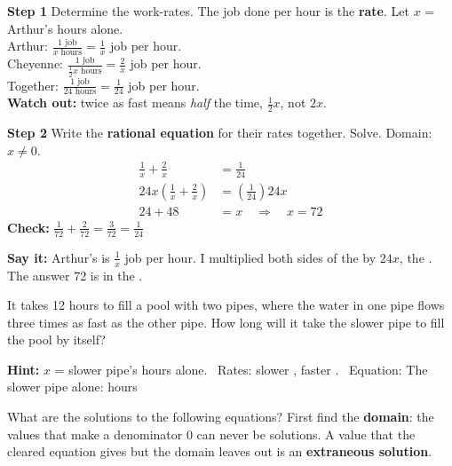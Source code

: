 \begin{minipage}[t]{0.50\textwidth}
\vspace{0pt}\raggedright
\textbf{Step 1} Determine the work-rates. The job done per hour is the \textbf{rate}. Let $x$ = Arthur's hours alone.\\[2pt]
Arthur: $\frac{1\text{ job}}{x\text{ hours}}=\frac1x$ job per hour.\\[2pt]
Cheyenne: $\frac{1\text{ job}}{\frac12x\text{ hours}}=\frac2x$ job per hour.\\[2pt]
Together: $\frac{1\text{ job}}{24\text{ hours}}=\frac1{24}$ job per hour.\\[3pt]
{\small\textbf{Watch out:} twice as fast means \emph{half} the time, $\tfrac12x$, not $2x$.}
\end{minipage}\hfill
\begin{minipage}[t]{0.46\textwidth}
\vspace{0pt}\raggedright
\textbf{Step 2} Write the \textbf{rational equation} for their rates together. Solve. {\small Domain: $x\neq0$.}
\vspace{-6pt}
\begin{align*}
\frac1x+\frac2x&=\frac1{24}\\
24x\left(\frac1x+\frac2x\right)&=\left(\frac1{24}\right)24x\\
24+48&=x \quad\Rightarrow\quad x=72
\end{align*}
\textbf{Check:} $\tfrac1{72}+\tfrac2{72}=\tfrac3{72}=\tfrac1{24}$ \checkmark\\[2pt]
\end{minipage}

\vspace{3pt}
\textbf{Say it:} Arthur's \blank[1.4cm] is $\tfrac1x$ job per hour. I multiplied both sides of the \blank[3cm] by $24x$, the \blank[3.4cm]. The answer 72 is in the \blank[1.6cm].

It takes 12 hours to fill a pool with two pipes, where the water in one pipe flows three times as fast as the other pipe. How long will it take the slower pipe to fill the pool by itself?

\textbf{Hint:} $x$ = slower pipe's hours alone. \ Rates: slower \blank[1.2cm], faster \blank[1.2cm]. \ Equation: \blank[2.4cm]
\lines[2]
The slower pipe alone: \blank[2cm] hours

\newpage
{}
What are the solutions to the following equations? First find the \textbf{domain}: the values that make a denominator 0 can never be solutions. A value that the cleared equation gives but the domain leaves out is an \textbf{extraneous solution}.

